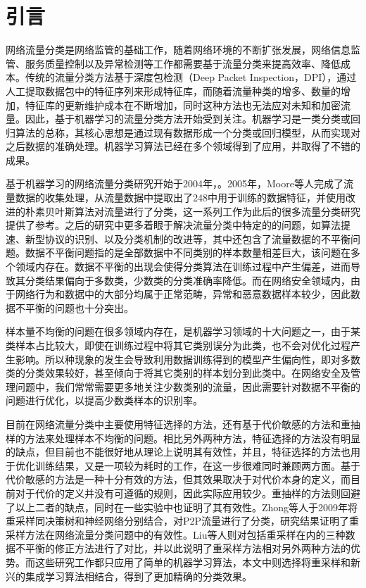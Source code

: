 \documentclass[a4papper]{article}
\begin{document}
\section{引言}
\par\setlength{\parindent}{2em} %
网络流量分类是网络监管的基础工作，随着网络环境的不断扩张发展，网络信息监管、服务质量控制以及异常检测等工作都需要基于流量分类来提高效率、降低成本。传统的流量分类方法基于深度包检测（Deep Packet Inspection，DPI），通过人工提取数据包中的特征序列来形成特征库，而随着流量种类的增多、数量的增加，特征库的更新维护成本在不断增加，同时这种方法也无法应对未知和加密流量。因此，基于机器学习的流量分类方法开始受到关注。机器学习是一类分类或回归算法的总称，其核心思想是通过现有数据形成一个分类或回归模型，从而实现对之后数据的准确处理。机器学习算法已经在多个领域得到了应用，并取得了不错的成果。
\par\setlength{\parindent}{2em} %
基于机器学习的网络流量分类研究开始于2004年，。2005年，Moore等人完成了流量数据的收集处理，从流量数据中提取出了248中用于训练的数据特征，并使用改进的朴素贝叶斯算法对流量进行了分类，这一系列工作为此后的很多流量分类研究提供了参考。之后的研究中更多着眼于解决流量分类中特定的的问题，如算法提速、新型协议的识别、以及分类机制的改进等，其中还包含了流量数据的不平衡问题。数据不平衡问题指的是全部数据中不同类别的样本数量相差巨大，该问题在多个领域内存在。数据不平衡的出现会使得分类算法在训练过程中产生偏差，进而导致其分类结果偏向于多数类，少数类的分类准确率降低。而在网络安全领域内，由于网络行为和数据中的大部分均属于正常范畴，异常和恶意数据样本较少，因此数据不平衡的问题也十分突出。
\par\setlength{\parindent}{2em} %
样本量不均衡的问题在很多领域内存在，是机器学习领域的十大问题之一，由于某类样本占比较大，即使在训练过程中将其它类别误分为此类，也不会对优化过程产生影响。所以种现象的发生会导致利用数据训练得到的模型产生偏向性，即对多数类的分类效果较好，甚至倾向于将其它类别的样本划分到此类中。在网络安全及管理问题中，我们常常需要更多地关注少数类别的流量，因此需要针对数据不平衡的问题进行优化，以提高少数类样本的识别率。
\par\setlength{\parindent}{2em} %
目前在网络流量分类中主要使用特征选择的方法，还有基于代价敏感的方法和重抽样的方法来处理样本不均衡的问题。相比另外两种方法，特征选择的方法没有明显的缺点，但目前也不能很好地从理论上说明其有效性，并且，特征选择的方法也用于优化训练结果，又是一项较为耗时的工作，在这一步很难同时兼顾两方面。基于代价敏感的方法是一种十分有效的方法，但其效果取决于对代价本身的定义，而目前对于代价的定义并没有可遵循的规则，因此实际应用较少。重抽样的方法则回避了以上二者的缺点，同时在一些实验中也证明了其有效性。Zhong等人于2009年将重采样同决策树和神经网络分别结合，对P2P流量进行了分类，研究结果证明了重采样方法在网络流量分类问题中的有效性。Liu等人则对包括重采样在内的三种数据不平衡的修正方法进行了对比，并以此说明了重采样方法相对另外两种方法的优势。而这些研究工作都只应用了简单的机器学习算法，本文中则选择将重采样和新兴的集成学习算法相结合，得到了更加精确的分类效果。
\end{document}
